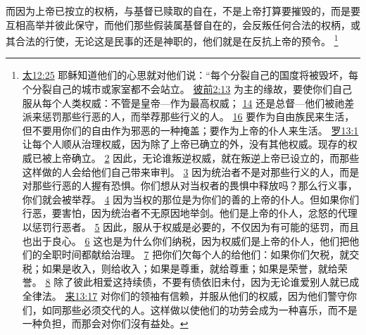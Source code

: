 \documentclass[12pt, a4paper, oneside]{ctexart}
\newcounter{parnum}[section]
\newcommand{\N}{%
   \noindent\refstepcounter{parnum}%
    \makebox[\parindent][l]{\textbf{\arabic{parnum}.}}}
\begin{document}
\N 而因为上帝已按立的权柄，与基督已赎取的自在，不是上帝打算要摧毁的，而是要互相高举并彼此保守，而他们那些假装属基督自在的，会反叛任何合法的权柄，或其合法的行使，无论这是民事的还是神职的，他们就是在反抗上帝的预令。
	\footnote {
		\href{https://biblehub.com/matthew/12-25.htm}{太12:25} 耶稣知道他们的心思就对他们说：“每个分裂自己的国度将被毁坏，每个分裂自己的城市或家室都不会站立。
		\href{https://biblehub.com/1_peter/2-13.htm}{彼前2:13} 为主的缘故，要使你们自己服从每个人类权威：不管是皇帝---作为最高权威；
		\href{https://biblehub.com/1_peter/2-14.htm}{14} 还是总督---他们被祂差派来惩罚那些行恶的人，而举荐那些行义的人。
		\href{https://biblehub.com/1_peter/2-16.htm}{16} 要作为自由族民来生活，但不要用你们的自由作为邪恶的一种掩盖；要作为上帝的仆人来生活。
		\href{https://biblehub.com/romans/13-1.htm}{罗13:1} 让每个人顺从治理权威，因为除了上帝已确立的外，没有其他权威。现存的权威已被上帝确立。
		\href{https://biblehub.com/romans/13-2.htm}{2} 因此，无论谁叛逆权威，就在叛逆上帝已设立的，而那些这样做的人会给他们自己带来审判。
		\href{https://biblehub.com/romans/13-3.htm}{3} 因为统治者不是对那些行义的人，而是对那些行恶的人握有恐惧。你们想从对当权者的畏惧中释放吗？那么行义事，你们就会被举荐。
		\href{https://biblehub.com/romans/13-4.htm}{4} 因为当权的那位是为你们的善的上帝的仆人。但如果你们行恶，要害怕，因为统治者不无原因地举剑。他们是上帝的仆人，忿怒的代理以惩罚行恶者。
		\href{https://biblehub.com/romans/13-5.htm}{5} 因此，服从于权威是必要的，不仅因为有可能的惩罚，而且也出于良心。
		\href{https://biblehub.com/romans/13-6.htm}{6} 这也是为什么你们纳税，因为权威们是上帝的仆人，他们把他们的全职时间都献给治理。
		\href{https://biblehub.com/romans/13-7.htm}{7} 把你们欠每个人的给他们：如果你们欠税，就交税；如果是收入，则给收入；如果是尊重，就给尊重；如果是荣誉，就给荣誉。
		\href{https://biblehub.com/romans/13-8.htm}{8} 除了彼此相爱这持续债，不要有债依旧未付，因为无论谁爱别人就已成全律法。
		\href{https://biblehub.com/hebrews/13-17.htm}{来13:17} 对你们的领袖有信赖，并服从他们的权威，因为他们警守你们，如同那些必须交代的人。这样做以使他们的功劳会成为一种喜乐，而不是一种负担，而那会对你们沒有益处。
	}
\end{document}
